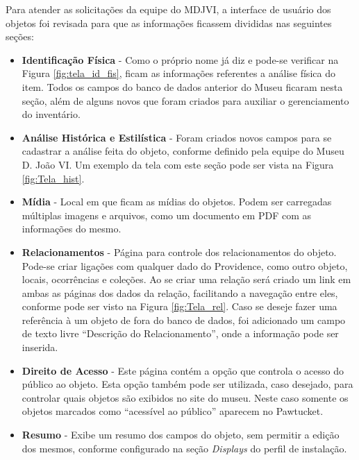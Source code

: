\documentclass[a4paper,12pt,oneside,onecolumn,final,fleqn]{repUERJ}
\begin{document}
Para atender as solicitações da equipe do MDJVI, a interface de usuário dos objetos foi revisada para que as informações ficassem divididas nas seguintes seções: 

\begin{itemize}
	\item \textbf{Identificação Física} - Como o próprio nome já diz e pode-se verificar na Figura \ref{fig:tela_id_fis},  ficam as informações referentes a análise física do item. Todos os campos do banco de dados anterior do Museu ficaram nesta seção, além de alguns novos que foram criados para auxiliar o gerenciamento do inventário.
	\item \textbf{Análise Histórica e Estilística} - Foram criados novos campos para se cadastrar a análise feita do objeto, conforme definido pela equipe do Museu D. João VI. Um exemplo da tela com este seção pode ser vista na Figura \ref{fig:Tela_hist}. 
	\item \textbf{Mídia} - Local em que ficam as mídias do objetos. Podem ser carregadas múltiplas imagens e arquivos, como um documento em PDF com as informações do mesmo.
	\item \textbf{Relacionamentos} - Página para controle dos relacionamentos do objeto. Pode-se criar ligações com qualquer dado do Providence, como outro objeto, locais, ocorrências e coleções. Ao se criar uma relação será criado um link em ambas as páginas dos dados da relação, facilitando a navegação entre eles, conforme pode ser visto na Figura \ref{fig:Tela_rel}. Caso se deseje fazer uma referência à um objeto de fora do banco de dados, foi adicionado um campo de texto livre ``Descrição do Relacionamento'', onde a informação pode ser inserida.
	\item \textbf{Direito de Acesso} - Este página contém a opção que controla o acesso do público ao objeto. Esta opção também pode ser utilizada, caso desejado, para controlar quais objetos são exibidos no site do museu. Neste caso somente os objetos marcados como ``acessível ao público'' aparecem no Pawtucket.
	\item \textbf{Resumo} - Exibe um resumo dos campos do objeto, sem permitir a edição dos mesmos, conforme configurado na seção \textit{Displays} do perfil de instalação.
\end{itemize}
\end{document}
